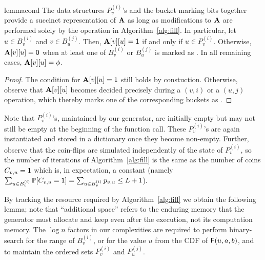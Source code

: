 \begin{restatable}{lemma}{cond}\label{lem:cond-0-fill}
The data structures $P_v^{(i)}$'s and the bucket marking bits together provide a succinct representation of $\mathbf{A}$ as long as modifications to $\mathbf{A}$ are performed solely by the  operation in Algorithm~\ref{alg:fill}. In particular, let $u \in B_v^{(i)}$ and $v \in B_u^{(j)}$. Then, $\mathbf{A}[v][u]=\mathsf{1}$ if and only if $u \in P_v^{(i)}$. Otherwise, $\mathbf{A}[v][u]=\mathsf{0}$ when at least one of $B_v^{(i)}$ or $B_u^{(j)}$ is marked as \filled. In all remaining cases, $\mathbf{A}[v][u]=\phi$.
\end{restatable}
\begin{proof}
The condition for $\mathbf{A}[v][u]=\mathsf{1}$ still holds by constuction. Otherwise, observe that $\mathbf{A}[v][u]$ becomes decided precisely during a $(v,i)$ or a $(u,j)$ operation, which thereby marks one of the corresponding buckets as \filled.
\end{proof}


Note that $P_v^{(i)}$'s, maintained by our generator, are initially empty but may not still be empty at the beginning of the  function call. These $P_v^{(i)}$'s are again instantiated and stored in a dictionary once they become non-empty.
Further, observe that the coin-flips are simulated independently of the state of $P_v^{(i)}$, so the number of iterations of Algorithm~\ref{alg:fill} is the same as the number of coins $C_{v,u} = \mathsf{1}$ which is, in expectation, a constant (namely $\sum_{u\in B_v^{(i)}} \mathbb P[C_{v,u}=\mathsf{1}] = \sum_{u\in B_v^{(i)}} p_{v,u} \leq L+1$). %



By tracking the resource required by Algorithm~\ref{alg:fill} we obtain the following lemma; note that ``additional space'' refers to the enduring memory that the generator must allocate and keep even after the execution, not its computation memory. The $\log n$ factors in our complexities are required to perform binary-search for the range of $B_v^{(i)}$, or for the value $u$ from the CDF of $\mathsf{F}(u,a,b)$, and to maintain the ordered sets $P_v^{(i)}$ and $P_u^{(j)}$.

